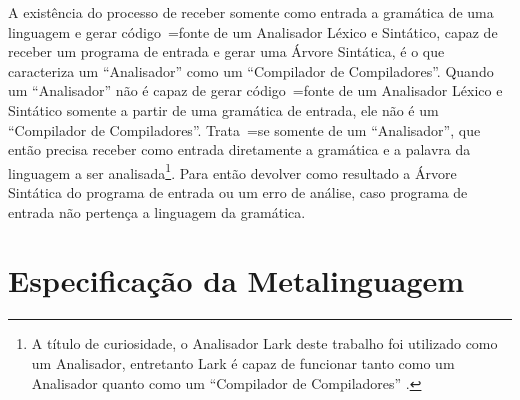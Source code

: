 A existência do processo de receber somente como entrada a gramática de uma linguagem e
gerar código~=fonte de um Analisador Léxico e
Sintático,
capaz de receber um programa de entrada e
gerar uma Árvore Sintática,
é o que caracteriza um ``Analisador'' como um ``Compilador de Compiladores''.
Quando um ``Analisador'' não é capaz de gerar código~=fonte de um Analisador Léxico e
Sintático somente a partir de uma gramática de entrada,
ele não é um ``Compilador de Compiladores''.
Trata~=se somente de um ``Analisador'',
que então precisa receber como entrada diretamente a gramática e
a palavra da linguagem a ser analisada\footnote{
A título de curiosidade,
o Analisador Lark deste trabalho foi utilizado como um Analisador,
entretanto Lark é capaz de funcionar tanto como um Analisador quanto como um ``Compilador de Compiladores'' \cite{antlrBookTerrentParr}.
}.
Para então devolver como resultado a Árvore Sintática do programa de entrada ou
um erro de análise,
caso programa de entrada não pertença a linguagem da gramática.


\section{Especificação da Metalinguagem}
\label{section:metalinguagemGrammar}

